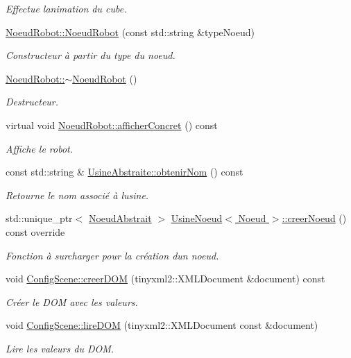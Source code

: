 \begin{DoxyCompactItemize}
\begin{DoxyCompactList}\small\item\em Effectue l\textquotesingle{}animation du cube. \end{DoxyCompactList}\item 
\hyperlink{group__inf2990_ga147453ac7f72970d7d9bfe336998ad94}{Noeud\+Robot\+::\+Noeud\+Robot} (const std\+::string \&type\+Noeud)
\begin{DoxyCompactList}\small\item\em Constructeur à partir du type du noeud. \end{DoxyCompactList}\item 
\hyperlink{group__inf2990_ga5649710d151f0548d8a7a279aad4c655}{Noeud\+Robot\+::$\sim$\+Noeud\+Robot} ()
\begin{DoxyCompactList}\small\item\em Destructeur. \end{DoxyCompactList}\item 
virtual void \hyperlink{group__inf2990_gad63a8e09cc5ca8cc349f35e0901474e2}{Noeud\+Robot\+::afficher\+Concret} () const 
\begin{DoxyCompactList}\small\item\em Affiche le robot. \end{DoxyCompactList}\item 
\hypertarget{group__inf2990_gad39877ea31a37efc3e58708193155c3c}{}const std\+::string \& \hyperlink{group__inf2990_gad39877ea31a37efc3e58708193155c3c}{Usine\+Abstraite\+::obtenir\+Nom} () const \label{group__inf2990_gad39877ea31a37efc3e58708193155c3c}

\begin{DoxyCompactList}\small\item\em Retourne le nom associé à l\textquotesingle{}usine. \end{DoxyCompactList}\item 
std\+::unique\+\_\+ptr$<$ \hyperlink{class_noeud_abstrait}{Noeud\+Abstrait} $>$ \hyperlink{group__inf2990_gaffd84653b96be43050e5dd25fff10751}{Usine\+Noeud$<$ Noeud $>$\+::creer\+Noeud} () const  override
\begin{DoxyCompactList}\small\item\em Fonction à surcharger pour la création d\textquotesingle{}un noeud. \end{DoxyCompactList}\item 
void \hyperlink{group__inf2990_ga3d0152df0c8c134ecd1a1741302db839}{Config\+Scene\+::creer\+D\+O\+M} (tinyxml2\+::\+X\+M\+L\+Document \&document) const 
\begin{DoxyCompactList}\small\item\em Créer le D\+O\+M avec les valeurs. \end{DoxyCompactList}\item 
void \hyperlink{group__inf2990_gaeacd60be947ce76a1302f6bbb40c90b1}{Config\+Scene\+::lire\+D\+O\+M} (tinyxml2\+::\+X\+M\+L\+Document const \&document)
\begin{DoxyCompactList}\small\item\em Lire les valeurs du D\+O\+M. \end{DoxyCompactList}\end{DoxyCompactItemize}
